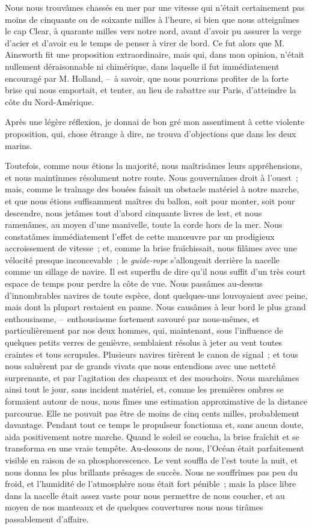 \documentclass[french,twoside]{book} %
\begin{document}
Nous nous trouvâmes chassés en mer par une vitesse qui n’était certainement pas moins de cinquante ou de soixante milles à l’heure, si bien que nous atteignîmes le cap Clear, à quarante milles vers notre nord, avant d’avoir pu assurer la verge d’acier et d’avoir eu le temps de penser à virer de bord. Ce fut alors que M. Ainsworth fit une proposition extraordinaire, mais qui, dans mon opinion, n’était nullement déraisonnable ni chimérique, dans laquelle il fut immédiatement encouragé par M. Holland, – à savoir, que nous pourrions profiter de la forte brise qui nous emportait, et tenter, au lieu de rabattre sur Paris, d’atteindre la côte du Nord-Amérique.\par
Après une légère réflexion, je donnai de bon gré mon assentiment à cette violente proposition, qui, chose étrange à dire, ne trouva d’objections que dans les deux marins.\par
Toutefois, comme nous étions la majorité, nous maîtrisâmes leurs appréhensions, et nous maintînmes résolument notre route. Nous gouvernâmes droit à l’ouest ; mais, comme le traînage des bouées faisait un obstacle matériel à notre marche, et que nous étions suffisamment maîtres du ballon, soit pour monter, soit pour descendre, nous jetâmes tout d’abord cinquante livres de lest, et nous ramenâmes, au moyen d’une manivelle, toute la corde hors de la mer. Nous constatâmes immédiatement l’effet de cette manœuvre par un prodigieux accroissement de vitesse ; et, comme la brise fraîchissait, nous filâmes avec une vélocité presque inconcevable ; le \emph{guide-rope} s’allongeait derrière la nacelle comme un sillage de navire. Il est superflu de dire qu’il nous suffit d’un très court espace de temps pour perdre la côte de vue. Nous passâmes au-dessus d’innombrables navires de toute espèce, dont quelques-uns louvoyaient avec peine, mais dont la plupart restaient en panne. Nous causâmes à leur bord le plus grand enthousiasme, – enthousiasme fortement savouré par nous-mêmes, et particulièrement par nos deux hommes, qui, maintenant, sous l’influence de quelques petits verres de genièvre, semblaient résolus à jeter au vent toutes craintes et tous scrupules. Plusieurs navires tirèrent le canon de signal ; et tous nous saluèrent par de grands vivats que nous entendions avec une netteté surprenante, et par l’agitation des chapeaux et des mouchoirs. Nous marchâmes ainsi tout le jour, sans incident matériel, et, comme les premières ombres se formaient autour de nous, nous fîmes une estimation approximative de la distance parcourue. Elle ne pouvait pas être de moins de cinq cents milles, probablement davantage. Pendant tout ce temps le propulseur fonctionna et, sans aucun doute, aida positivement notre marche. Quand le soleil se coucha, la brise fraîchit et se transforma en une vraie tempête. Au-dessous de nous, l’Océan était parfaitement visible en raison de sa phosphorescence. Le vent souffla de l’est toute la nuit, et nous donna les plus brillants présages de succès. Nous ne souffrîmes pas peu du froid, et l’humidité de l’atmosphère nous était fort pénible ; mais la place libre dans la nacelle était assez vaste pour nous permettre de nous coucher, et au moyen de nos manteaux et de quelques couvertures nous nous tirâmes passablement d’affaire.\par
\end{document}
